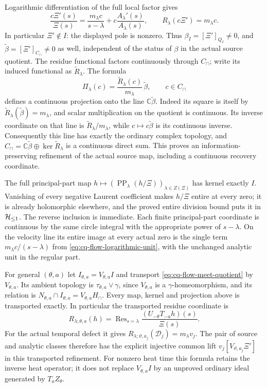 Logarithmic differentiation of the full local factor gives
\begin{equation}
 \frac{c\Xi'(s)}{\Xi(s)}
 =\frac{m_\lambda c}{s-\lambda}
        +c\frac{A_\lambda'(s)}{A_\lambda(s)},\qquad
 R_\lambda(c\Xi')=m_\lambda c .
 \label{eq:cq-flow-logarithmic-unit}
\end{equation}
In particular $\Xi'\notin I$: the displayed pole is nonzero.
Thus $\beta_I=[\Xi']_{Q_I}\ne0$, and
$\widetilde\beta=[\Xi']_{C_\cap}\ne0$ as well, independent of the
status of $\beta$ in the actual source quotient.
The residue functional factors continuously through $C_\cap$; write
its induced functional as $\widetilde R_\lambda$.
The formula
\begin{equation}
 \Pi_\lambda(c)
  =\frac{\widetilde R_\lambda(c)}{m_\lambda}\,
                  \widetilde\beta,\qquad c\in C_\cap
 \label{eq:cq-flow-meet-projection}
\end{equation}
defines a continuous projection onto the line
$\mathbb C\widetilde\beta$. Indeed its square is itself by
$\widetilde R_\lambda(\widetilde\beta)=m_\lambda$, and scalar
multiplication on the quotient is continuous. Its inverse coordinate
on that line is $\widetilde R_\lambda/m_\lambda$, while
$c\mapsto c\widetilde\beta$ is its continuous inverse.
Consequently this line has exactly the ordinary complex topology,
and
$C_\cap=\mathbb C\widetilde\beta\oplus
\ker\widetilde R_\lambda$ is a continuous direct sum.
This proves an information-preserving refinement of the actual
source map, including a continuous recovery coordinate.

The full principal-part map
$h\mapsto(\operatorname{PP}_\lambda(h/\Xi))_{\lambda\in Z(\Xi)}$
has kernel exactly $I$. Vanishing of every negative Laurent
coefficient makes $h/\Xi$ entire at every zero; it is already
holomorphic elsewhere, and the proved entire division bound
puts it in $\mathcal H_{\leq 1}$. The reverse inclusion is immediate.
Each finite principal-part coordinate is continuous by the same
circle integral with the appropriate power of $s-\lambda$.
On the velocity line its entire image at every actual zero is
the single term $m_\lambda c/(s-\lambda)$ from
\eqref{eq:cq-flow-logarithmic-unit}, with the unchanged analytic
unit in the regular part.

For general $(\theta,a)$ let
$I_{\theta,a}=V_{\theta,a}I$ and transport
\eqref{eq:cq-flow-meet-quotient} by $V_{\theta,a}$.
Its ambient topology is
$\tau_{\theta,a}\vee\gamma$, since $V_{\theta,a}$ is a
$\gamma$-homeomorphism, and its relation is
$N_{\theta,a}\cap I_{\theta,a}=V_{\theta,a}H_\cap$.
Every map, kernel and projection above is transported exactly.
In particular the transported residue coordinate is
\[
 R_{\lambda;\theta,a}(h)
 =\operatorname{Res}_{s=\lambda}
           \frac{(U_{-\theta}T_{-a}h)(s)}{\Xi(s)}.
\]
For the actual temporal defect it gives
$R_{\lambda;\vartheta,a_j}(\mathcal D_j)=m_\lambda v_j$.
The pair of source and analytic classes therefore has the
explicit injective common lift
$v_j[V_{\vartheta,a_j}\Xi']$ in this transported refinement.
For nonzero heat time this formula retains the inverse heat
operator; it does not replace $V_{\theta,a}I$ by an unproved
ordinary ideal generated by $T_aZ_\theta$.

